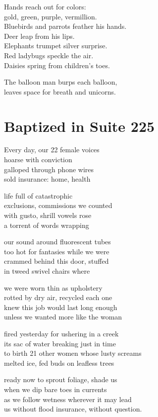 \documentclass[twoside,10pt]{book}
\begin{document}
Hands reach out for colors:\\
gold, green, purple, vermillion.\\
Bluebirds and parrots feather his hands.\\
Deer leap from his lips.\\
Elephants trumpet silver surprise.\\
Red ladybugs speckle the air.\\
Daisies spring from children's toes.

The balloon man burps each balloon,\\
leaves space for breath and unicorns.

\clearpage
\section{Baptized in Suite 225}

Every day, our 22 female voices\\
hoarse with conviction\\
galloped through phone wires\\
sold insurance: home, health

life full of catastrophic\\
exclusions, commissions we counted\\
with gusto, shrill vowels rose\\
a torrent of words wrapping

our sound around fluorescent tubes\\
too hot for fantasies while we were\\
crammed behind this door, stuffed\\
in tweed swivel chairs where

we were worn thin as upholstery\\
rotted by dry air, recycled each one\\
knew this job would last long enough\\
unless we wanted more like the woman

fired yesterday for ushering in a creek\\
its sac of water breaking just in time\\
to birth 21 other women whose lusty screams\\
melted ice, fed buds on leafless trees

ready now to sprout foliage, shade us\\
when we dip bare toes in currents\\
as we follow wetness wherever it may lead\\
us without flood insurance, without question.
\end{document}
